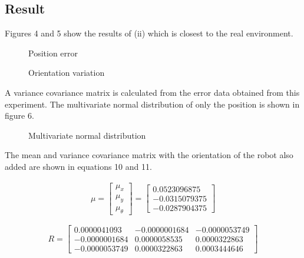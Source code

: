 \documentclass[a4paper]{article}
\begin{document}
\subsection{Result}
Figures 4 and 5 show the results of (ii) which is closest to the real environment.

\begin{figure}[H]
    \centerline{}
    \caption{Position error}
\end{figure}
\begin{figure}[H]
    \centerline{}
    \caption{Orientation variation}
\end{figure}

A variance covariance matrix is ​​calculated from the error data obtained from this experiment. 
The multivariate normal distribution of only the position is shown in figure 6.
\begin{figure}[H]
    \centerline{}
    \caption{Multivariate normal distribution}
\end{figure}

The mean and variance covariance matrix with the orientation of the robot 
also added are shown in equations 10 and 11.

\begin{equation}
    \begin{split}
     \mu = 
     \begin{bmatrix}
        \mu_x \\
        \mu_y \\
        \mu_\theta
     \end{bmatrix}
     =
     \begin{bmatrix}
        0.0523096875 \\
        -0.0315079375 \\
        -0.0287904375
     \end{bmatrix}
    \end{split}
    \label{eq:10} 
\end{equation}

\begin{equation}
    R = 
    \begin{bmatrix}
        0.0000041093 & -0.0000001684 & -0.0000053749 \\
        -0.0000001684 & 0.0000058535 & 0.0000322863 \\
        -0.0000053749 & 0.0000322863 & 0.0003444646 
    \end{bmatrix}
    \label{eq:11} 
\end{equation}
\end{document}
